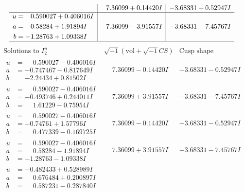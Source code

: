 \documentclass[1p]{elsarticle_modified}
\theoremstyle{definition}
\newcommand{\I}{\sqrt{-1}}
\begin{document}
$$\begin{array}{c|c|c}
 & \phantom{-}7.36099 + 0.14420 I & -3.68331 + 0.52947 I \\ \hline\begin{aligned}
u &= \phantom{-}0.590027 + 0.406016 I \\
a &= \phantom{-}0.58284 + 1.91894 I \\
b &= -1.28763 + 1.09338 I\end{aligned}
 & \phantom{-}7.36099 - 3.91557 I & -3.68331 + 7.45767 I\\
 \hline 
 \end{array}$$\newpage$$\begin{array}{c|c|c}  
\text{Solutions to }I^u_{2}& \I (\text{vol} + \sqrt{-1}CS) & \text{Cusp shape}\\
 \hline 
\begin{aligned}
u &= \phantom{-}0.590027 - 0.406016 I \\
a &= -0.747467 - 0.817649 I \\
b &= -2.24434 + 0.81502 I\end{aligned}
 & \phantom{-}7.36099 - 0.14420 I & -3.68331 - 0.52947 I \\ \hline\begin{aligned}
u &= \phantom{-}0.590027 - 0.406016 I \\
a &= -0.493746 + 0.244011 I \\
b &= \phantom{-}1.61229 - 0.75954 I\end{aligned}
 & \phantom{-}7.36099 + 3.91557 I & -3.68331 - 7.45767 I \\ \hline\begin{aligned}
u &= \phantom{-}0.590027 - 0.406016 I \\
a &= -0.74761 + 1.57796 I \\
b &= \phantom{-}0.477339 - 0.169725 I\end{aligned}
 & \phantom{-}7.36099 - 0.14420 I & -3.68331 - 0.52947 I \\ \hline\begin{aligned}
u &= \phantom{-}0.590027 - 0.406016 I \\
a &= \phantom{-}0.58284 - 1.91894 I \\
b &= -1.28763 - 1.09338 I\end{aligned}
 & \phantom{-}7.36099 + 3.91557 I & -3.68331 - 7.45767 I \\ \hline\begin{aligned}
u &= -0.482433 + 0.528989 I \\
a &= \phantom{-}0.676484 + 0.200897 I \\
b &= \phantom{-}0.587231 - 0.287840 I\end{aligned}

\end{array}$$
\end{document}
